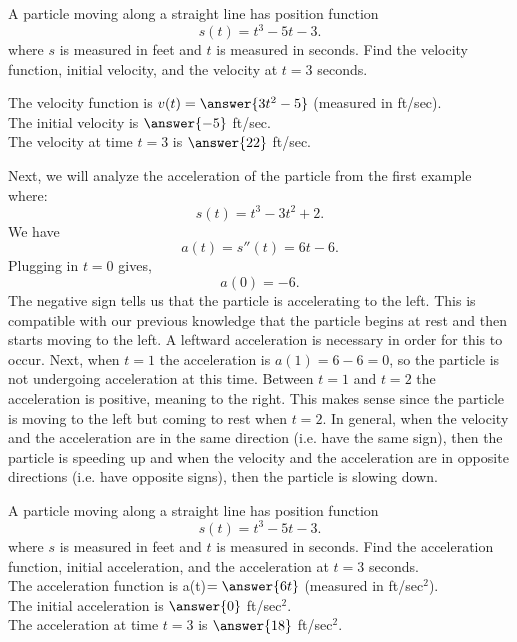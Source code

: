 \documentclass{ximera}
\begin{document}
\begin{problem}
A particle moving along a straight line has position function
\[s(t) = t^3 - 5t -3.\]
where $s$ is measured in feet and $t$ is measured in seconds.
Find the velocity function, initial velocity, and the velocity at $t = 3$ seconds.

The velocity function is $v(t) = \answer{3t^2 -5}$ (measured in ft/sec).\\
The initial velocity is $\answer{-5}$ ft/sec.\\
The velocity at time $t=3$ is $\answer{22}$ ft/sec.\\


\end{problem}

 

\begin{example}
Next, we will analyze the acceleration of the particle from the first example where:
\[s(t) = t^3 - 3t^2 + 2.\]
We have
\[a(t) = s''(t) = 6t -6.\]
Plugging in $t=0$ gives,
\[a(0) = -6.\]
The negative sign tells us that the particle is accelerating to the left. 
This is compatible with our previous knowledge that the particle begins at rest and then starts moving to the left. 
A leftward acceleration is necessary in order for this to occur.
Next, when $t=1$ the acceleration is $a(1) = 6-6 = 0$, so the particle is not undergoing acceleration at this time.
Between $t=1$ and $t = 2$ the acceleration is positive, meaning to the right. 
This makes sense since the particle is moving to the left but coming to rest when $t = 2$.
In general, when the velocity and the acceleration are in the same direction (i.e. have the same sign), 
then the particle is speeding up and when
the velocity and the acceleration are in opposite directions (i.e. have opposite signs),  then the particle is slowing down.
\end{example}

\begin{problem}
A particle moving along a straight line has position function
\[s(t) = t^3 - 5t -3.\]
where $s$ is measured in feet and $t$ is measured in seconds.
Find the acceleration function, initial acceleration, and the acceleration at $t = 3$ seconds.\\

The acceleration function is a(t)$ = \answer{6t}$ (measured in ft/sec$^2$).\\
The initial acceleration is $\answer{0}$ ft/sec$^2$.\\
The acceleration at time $t=3$ is $\answer{18}$ ft/sec$^2$.


\end{problem}
\end{document}
